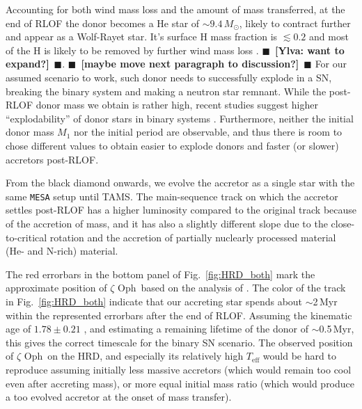 \documentclass[twocolumn,twocolappendix,trackchanges]{aastex63}
\DeclareRobustCommand{\Figref}[1]{Fig.~\ref{#1}}
\newcommand{\zoph}{$\zeta$ Oph}
\newcommand{\todo}[1]{{\large $\blacksquare$~\textbf{\color{red}[#1]}}~$\blacksquare$}
\begin{document}
Accounting for both wind mass loss and the amount of mass transferred, at the end of RLOF the donor becomes a He star of
$\sim$$9.4\,M_\odot$, likely to contract further and appear as a
Wolf-Rayet star. It's surface H mass fraction is $\lesssim 0.2$ and
most of the H is likely to be removed by further wind mass loss
\citep[e.g.,][]{gotberg:17}. \todo{Ylva: want to expand?}.
\todo{maybe move next paragraph to discussion?} For our assumed
scenario to work, such donor needs to successfully explode in a SN,
breaking the binary system and making a neutron star remnant. While
the post-RLOF donor mass we obtain is rather high, recent studies
suggest higher ``explodability'' of donor stars in binary systems
\citep[e.g.,][]{schneider:21, laplace:21, vartanyan:21}. Furthermore,
neither the initial donor mass $M_1$ nor the initial period are observable,
and thus there is room to chose different values to obtain easier to
explode donors and faster (or slower) accretors post-RLOF.

From the black diamond onwards, we evolve the accretor as a single star with the same \texttt{MESA} setup until TAMS. The main-sequence track on which the accretor settles post-RLOF has a higher luminosity compared to the original track because of the accretion of mass, and it has also a slightly different slope due to the close-to-critical rotation and the accretion of partially nuclearly processed material (He- and N-rich) material.

The red errorbars in the bottom panel of \Figref{fig:HRD_both} mark the approximate position of \zoph\ based on the analysis of \cite{villamariz:05}. The color of the track in \Figref{fig:HRD_both} indicate that our accreting star spends about
$\sim$2\,Myr within the represented errorbars after the end of RLOF. Assuming the kinematic age of
$1.78\pm0.21$ \citep{neuhauser:20}, and estimating a remaining lifetime of the donor of
$\sim$0.5\,Myr, this gives the correct timescale for the binary SN scenario.
The observed position of \zoph\ on the HRD, and especially
its relatively high $T_\mathrm{eff}$ would be hard to reproduce
assuming initially less massive accretors (which would remain too cool
even after accreting mass), or more equal initial mass ratio (which
would produce a too evolved accretor at the onset of mass transfer).
\end{document}
